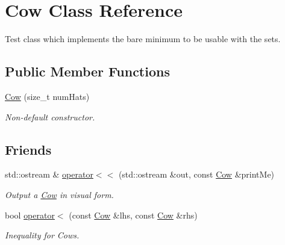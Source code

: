 \hypertarget{class_cow}{\section{Cow Class Reference}
\label{class_cow}
}


Test class which implements the bare minimum to be usable with the sets.  


\subsection*{Public Member Functions}
\begin{DoxyCompactItemize}
\item 
\hypertarget{class_cow_a7d60406c5ed4761cf6e71c329762255f}{\hyperlink{class_cow_a7d60406c5ed4761cf6e71c329762255f}{Cow} (size\-\_\-t num\-Hats)}\label{class_cow_a7d60406c5ed4761cf6e71c329762255f}

\begin{DoxyCompactList}\small\item\em Non-\/default constructor. \end{DoxyCompactList}\end{DoxyCompactItemize}
\subsection*{Friends}
\begin{DoxyCompactItemize}
\item 
\hypertarget{class_cow_a23e10f6dc9387f62836b1a11290f7432}{std\-::ostream \& \hyperlink{class_cow_a23e10f6dc9387f62836b1a11290f7432}{operator$<$$<$} (std\-::ostream \&out, const \hyperlink{class_cow}{Cow} \&print\-Me)}\label{class_cow_a23e10f6dc9387f62836b1a11290f7432}

\begin{DoxyCompactList}\small\item\em Output a \hyperlink{class_cow}{Cow} in visual form. \end{DoxyCompactList}\item 
\hypertarget{class_cow_ad9b4faa3b4ff57053311dfc10dc65bf1}{bool \hyperlink{class_cow_ad9b4faa3b4ff57053311dfc10dc65bf1}{operator$<$} (const \hyperlink{class_cow}{Cow} \&lhs, const \hyperlink{class_cow}{Cow} \&rhs)}\label{class_cow_ad9b4faa3b4ff57053311dfc10dc65bf1}

\begin{DoxyCompactList}\small\item\em Inequality for Cows. \end{DoxyCompactList}\end{DoxyCompactItemize}


